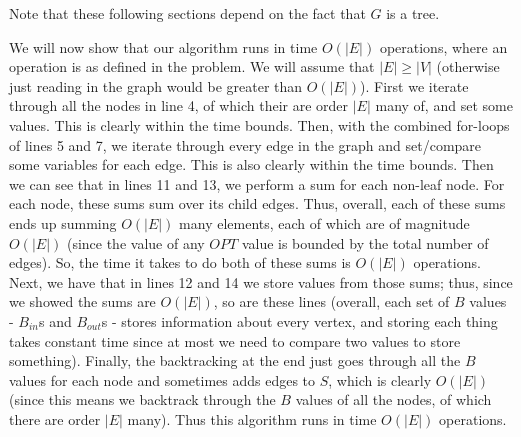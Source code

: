 \documentclass{article}
\begin{document}
\vspace{5mm}
Note that these following sections depend on the fact that $G$ is a tree.

We will now show that our algorithm runs in time $O(|E|)$ operations, where an
operation is as defined in the problem. We will assume that $|E| \geq |V|$
(otherwise just reading in the graph would be greater than $O(|E|)$).
First we iterate through all the nodes in line 4,
of which their are order $|E|$ many of, and set some values. This is clearly
within the time bounds. Then, with the combined for-loops of lines 5 and 7, we
iterate through every edge in the graph and set/compare some variables for each
edge. This is also clearly within the time bounds. Then we can see that in lines 11
and 13, we perform a sum for each non-leaf node. For each node, these sums sum
over its child edges. Thus, overall, each of these sums ends up summing $O(|E|)$
many elements, each of which are of magnitude $O(|E|)$ (since the value of any
$OPT$ value is bounded by the total number of edges). So, the time it takes to do
both of these sums is $O(|E|)$ operations. Next, we have that in lines 12 and 14
we store values from those sums; thus, since we showed the sums are $O(|E|)$, so
are these lines (overall, each set of $B$ values - $B_{in}$s and $B_{out}$s -
stores information about every vertex,
and storing each thing takes constant time since at most we need to compare two
values to store something). Finally, the backtracking at the end just goes through all the $B$ values for
each node and sometimes adds edges to $S$, which is clearly $O(|E|)$ (since this
means we backtrack through the $B$ values of all the nodes, of which there are
order $|E|$ many). Thus this algorithm
runs in time $O(|E|)$ operations.
\end{document}
